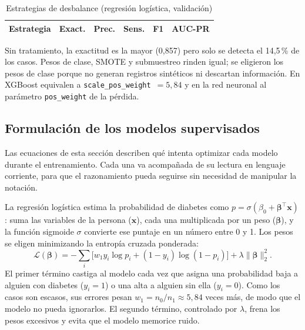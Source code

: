 \documentclass[conference,a4paper]{IEEEtran}
\begin{document}
\begin{table}[!t]
\centering
\caption{Estrategias de desbalance (regresión logística, validación)}
\label{tab:desbalance}
\scriptsize
\setlength{\tabcolsep}{4pt}
\begin{tabular}{@{}lrrrrr@{}}
\toprule
\textbf{Estrategia} & \textbf{Exact.} & \textbf{Prec.} & \textbf{Sens.} & \textbf{F1} & \textbf{AUC-PR} \\
\midrule

\end{tabular}
\end{table}

Sin tratamiento, la exactitud es la mayor (0,857) pero solo se detecta el 14,5\,\% de los casos. Pesos de clase, SMOTE \citep{chawla2002} y submuestreo rinden igual; se eligieron los pesos de clase porque no generan registros sintéticos ni descartan información. En XGBoost equivalen a \texttt{scale\_pos\_weight}~$=5{,}84$ y en la red neuronal al parámetro \texttt{pos\_weight} de la pérdida.

\subsection{Formulación de los modelos supervisados}
Las ecuaciones de esta sección describen qué intenta optimizar cada modelo durante el entrenamiento. Cada una va acompañada de su lectura en lenguaje corriente, para que el razonamiento pueda seguirse sin necesidad de manipular la notación.

La regresión logística estima la probabilidad de diabetes como $p=\sigma(\beta_0+\boldsymbol\beta^\top\mathbf x)$: suma las variables de la persona ($\mathbf x$), cada una multiplicada por un peso ($\boldsymbol\beta$), y la función sigmoide $\sigma$ convierte ese puntaje en un número entre 0 y 1. Los pesos se eligen minimizando la entropía cruzada ponderada:
\begin{equation}
\mathcal L(\boldsymbol\beta)=-\sum_i\big[w_1 y_i\log p_i+(1-y_i)\log(1-p_i)\big]+\lambda\lVert\boldsymbol\beta\rVert_2^2 .
\end{equation}
El primer término castiga al modelo cada vez que asigna una probabilidad baja a alguien con diabetes ($y_i=1$) o una alta a alguien sin ella ($y_i=0$). Como los casos son escasos, sus errores pesan $w_1=n_0/n_1\approx5{,}84$ veces más, de modo que el modelo no pueda ignorarlos. El segundo término, controlado por $\lambda$, frena los pesos excesivos y evita que el modelo memorice ruido.
\end{document}
